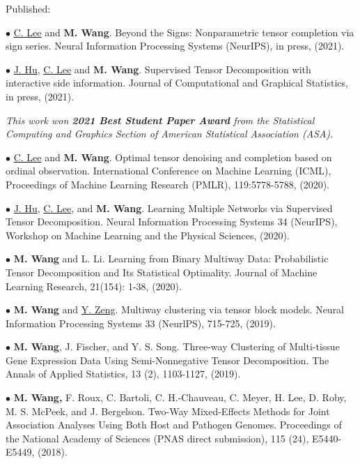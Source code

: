 \documentclass[letterpaper]{article}
\renewenvironment{itemize}{
  \begin{list}{}{
    \setlength{\leftmargin}{1.5em}
  }
}{
  \end{list}
}
\begin{document}
Published:
\begin{itemize}

\item$\bullet$  \underline{C. Lee} and {\bf M. Wang}. Beyond the Signs: Nonparametric tensor completion via sign series. Neural Information Processing Systems  (NeurIPS), in press, (2021). 

\item$\bullet$ \underline{J. Hu}, \underline{C. Lee} and {\bf M. Wang}. Supervised Tensor Decomposition with interactive side information. Journal of Computational and Graphical Statistics, in press, (2021). %

{\it This work won {\bf 2021 Best Student Paper Award} from the Statistical Computing and Graphics Section of American Statistical Association (ASA). }

\item$\bullet$ \underline{C. Lee} and {\bf M. Wang}. Optimal tensor denoising and completion based on ordinal observation. International Conference on Machine Learning (ICML), Proceedings of Machine Learning Research (PMLR), 119:5778-5788, (2020). %

\item$\bullet$ \underline{J. Hu}, \underline{C. Lee}, and {\bf M. Wang}. Learning Multiple Networks via Supervised Tensor Decomposition. Neural Information Processing Systems 34 (NeurIPS), Workshop on Machine Learning and the Physical Sciences, (2020). 

\item$\bullet$ {\bf M. Wang} and L. Li. Learning from Binary Multiway Data: Probabilistic Tensor Decomposition and Its Statistical Optimality. Journal of Machine Learning Research, 21(154): 1-38, (2020).

\item$\bullet$  {\bf M. Wang} and \underline{Y. Zeng}. Multiway clustering via tensor block models. Neural Information Processing Systems 33 (NeurlPS), 715-725, (2019). 

\item$\bullet$ {\bf M. Wang}, J. Fischer, and Y. S. Song. Three-way Clustering of Multi-tissue Gene Expression Data Using Semi-Nonnegative Tensor Decomposition. The Annals of Applied Statistics, 13 (2), 1103-1127, (2019). 

\item$\bullet$ {\bf M. Wang,} F. Roux, C. Bartoli, C. H.-Chauveau, C. Meyer, H. Lee, D. Roby,  M. S. McPeek, and J. Bergelson. Two-Way Mixed-Effects Methods for Joint Association Analyses Using Both Host and Pathogen Genomes. Proceedings of the National Academy of Sciences (PNAS direct submission), 115 (24), E5440-E5449, (2018).


\end{itemize}
\end{document}
